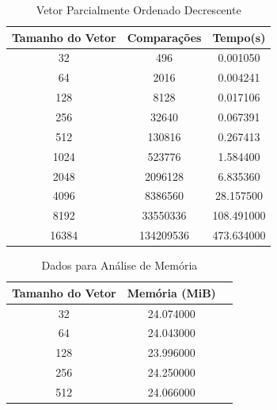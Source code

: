 \documentclass[12pt,a4paper,twoside]{report}
\begin{document}
\begin{table}[h]
  \centering
  \caption{Vetor Parcialmente Ordenado Decrescente \label{tab:pod}}
  \begin{tabular}{ccc} \\\hline
  \textbf{Tamanho do Vetor} & \textbf{Comparações} & \textbf{Tempo(s)} \\\hline
  32                        & 496                  & 0.001050          \\\hline
  64                        & 2016                 & 0.004241          \\\hline
  128                       & 8128                 & 0.017106          \\\hline
  256                       & 32640                & 0.067391          \\\hline
  512                       & 130816               & 0.267413          \\\hline
  1024                      & 523776               & 1.584400          \\\hline
  2048                      & 2096128              & 6.835360          \\\hline
  4096                      & 8386560              & 28.157500         \\\hline
  8192                      & 33550336             & 108.491000        \\\hline
  16384                     & 134209536            & 473.634000        \\\hline
  \end{tabular}
\end{table}


\begin{table}[h]
  \centering
  \caption{Dados para Análise de Memória \label{tab:memoria}}
  \begin{tabular}{ccc} \\\hline
  \textbf{Tamanho do Vetor} & \textbf{Memória (MiB)} \\\hline
  32                        & 24.074000                  \\\hline
  64                        & 24.043000            \\\hline
  128                       & 23.996000            \\\hline
  256                       & 24.250000            \\\hline
  512                       & 24.066000            \\\hline
  \end{tabular}
\end{table}
\end{document}
